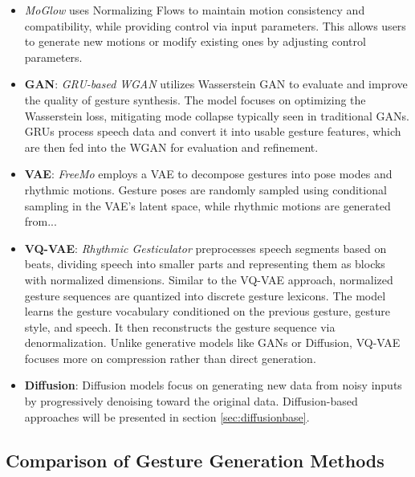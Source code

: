 \begin{itemize}
	\item \textit{MoGlow} \cite{henter2020moglow} uses Normalizing Flows to maintain motion consistency and compatibility, while providing control via input parameters. This allows users to generate new motions or modify existing ones by adjusting control parameters.
	
	\item \textbf{GAN}: \textit{GRU-based WGAN} \cite{wu2021probabilistic} utilizes Wasserstein GAN to evaluate and improve the quality of gesture synthesis. The model focuses on optimizing the Wasserstein loss, mitigating mode collapse typically seen in traditional GANs. GRUs process speech data and convert it into usable gesture features, which are then fed into the WGAN for evaluation and refinement.
	
	\item \textbf{VAE}: \textit{FreeMo} \cite{xu2022freeform} employs a VAE to decompose gestures into pose modes and rhythmic motions. Gesture poses are randomly sampled using conditional sampling in the VAE's latent space, while rhythmic motions are generated from...
	
	\item \textbf{VQ-VAE}: \textit{Rhythmic Gesticulator} \cite{ao2022rhythmic} preprocesses speech segments based on beats, dividing speech into smaller parts and representing them as blocks with normalized dimensions. Similar to the VQ-VAE approach, normalized gesture sequences are quantized into discrete gesture lexicons. The model learns the gesture vocabulary conditioned on the previous gesture, gesture style, and speech. It then reconstructs the gesture sequence via denormalization. Unlike generative models like GANs or Diffusion, VQ-VAE focuses more on compression rather than direct generation.
	
	\item \textbf{Diffusion}: Diffusion models focus on generating new data from noisy inputs by progressively denoising toward the original data. Diffusion-based approaches will be presented in section \autoref{sec:diffusionbase}.
\end{itemize}

\subsection{Comparison of Gesture Generation Methods}


